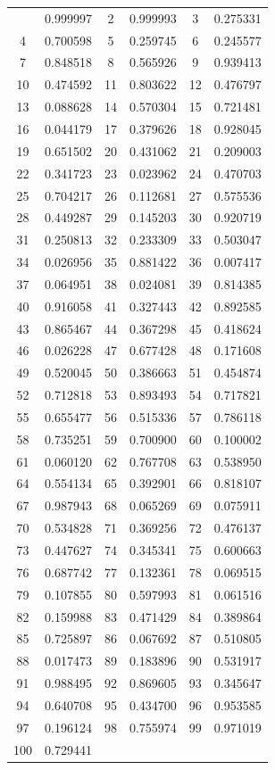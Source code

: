 \documentclass[12pt]{article}
\begin{document}
\begin{longtable}{@{}cc|cc|cc@{}}
\bottomrule
\endlastfoot
1 & 0.999997 & 2 & 0.999993 & 3 & 0.275331 \\
4 & 0.700598 & 5 & 0.259745 & 6 & 0.245577 \\
7 & 0.848518 & 8 & 0.565926 & 9 & 0.939413 \\
10 & 0.474592 & 11 & 0.803622 & 12 & 0.476797 \\
13 & 0.088628 & 14 & 0.570304 & 15 & 0.721481 \\
16 & 0.044179 & 17 & 0.379626 & 18 & 0.928045 \\
19 & 0.651502 & 20 & 0.431062 & 21 & 0.209003 \\
22 & 0.341723 & 23 & 0.023962 & 24 & 0.470703 \\
25 & 0.704217 & 26 & 0.112681 & 27 & 0.575536 \\
28 & 0.449287 & 29 & 0.145203 & 30 & 0.920719 \\
31 & 0.250813 & 32 & 0.233309 & 33 & 0.503047 \\
34 & 0.026956 & 35 & 0.881422 & 36 & 0.007417 \\
37 & 0.064951 & 38 & 0.024081 & 39 & 0.814385 \\
40 & 0.916058 & 41 & 0.327443 & 42 & 0.892585 \\
43 & 0.865467 & 44 & 0.367298 & 45 & 0.418624 \\
46 & 0.026228 & 47 & 0.677428 & 48 & 0.171608 \\
49 & 0.520045 & 50 & 0.386663 & 51 & 0.454874 \\
52 & 0.712818 & 53 & 0.893493 & 54 & 0.717821 \\
55 & 0.655477 & 56 & 0.515336 & 57 & 0.786118 \\
58 & 0.735251 & 59 & 0.700900 & 60 & 0.100002 \\
61 & 0.060120 & 62 & 0.767708 & 63 & 0.538950 \\
64 & 0.554134 & 65 & 0.392901 & 66 & 0.818107 \\
67 & 0.987943 & 68 & 0.065269 & 69 & 0.075911 \\
70 & 0.534828 & 71 & 0.369256 & 72 & 0.476137 \\
73 & 0.447627 & 74 & 0.345341 & 75 & 0.600663 \\
76 & 0.687742 & 77 & 0.132361 & 78 & 0.069515 \\
79 & 0.107855 & 80 & 0.597993 & 81 & 0.061516 \\
82 & 0.159988 & 83 & 0.471429 & 84 & 0.389864 \\
85 & 0.725897 & 86 & 0.067692 & 87 & 0.510805 \\
88 & 0.017473 & 89 & 0.183896 & 90 & 0.531917 \\
91 & 0.988495 & 92 & 0.869605 & 93 & 0.345647 \\
94 & 0.640708 & 95 & 0.434700 & 96 & 0.953585 \\
97 & 0.196124 & 98 & 0.755974 & 99 & 0.971019 \\
100 & 0.729441 &  &  &  &  \\

\end{longtable}
\end{document}

